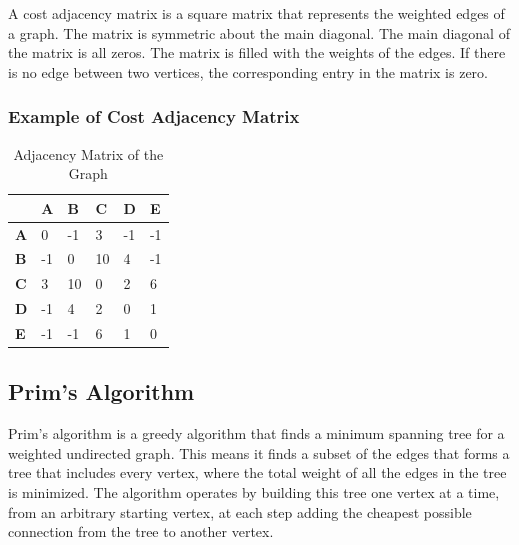 \documentclass[11pt]{article}
\begin{document}
A cost adjacency matrix is a square matrix that represents the weighted edges of a graph. The matrix is symmetric about the main diagonal. The main diagonal of the matrix is all zeros. The matrix is filled with the weights of the edges. If there is no edge between two vertices, the corresponding entry in the matrix is zero.

\subsubsection{Example of Cost Adjacency Matrix}

\begin{table}[H]
    \centering
    \begin{tabular}{|l|l|l|l|l|l|}
    \hline
    \textbf{}  & \textbf{A} & \textbf{B} & \textbf{C} & \textbf{D} & \textbf{E} \\ \hline
    \textbf{A} & 0          & -1         & 3          & -1         & -1         \\ \hline
    \textbf{B} & -1         & 0          & 10         & 4          & -1         \\ \hline
    \textbf{C} & 3          & 10         & 0          & 2          & 6          \\ \hline
    \textbf{D} & -1         & 4          & 2          & 0          & 1          \\ \hline
    \textbf{E} & -1         & -1         & 6          & 1          & 0          \\ \hline
    \end{tabular}
\caption[short]{Adjacency Matrix of the Graph}    
\end{table}
    
    \subsection{Prim's Algorithm}

Prim's algorithm is a greedy algorithm that finds a minimum spanning tree for a weighted undirected graph. This means it finds a subset of the edges that forms a tree that includes every vertex, where the total weight of all the edges in the tree is minimized. The algorithm operates by building this tree one vertex at a time, from an arbitrary starting vertex, at each step adding the cheapest possible connection from the tree to another vertex.
\end{document}
